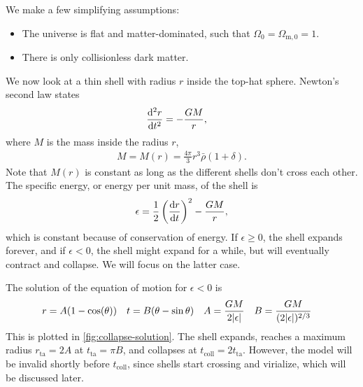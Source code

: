 We make a few simplifying assumptions:
\begin{itemize}
	\item The universe is flat and matter-dominated, such that $\Omega_0 = \Omega_{\text{m}, 0} = 1$.
	\item There is only collisionless dark matter.
\end{itemize}
We now look at a thin shell with radius $r$ inside the top-hat sphere. Newton's second law states
\begin{align*}
	\dv[2]{r}{t}
	&= - \frac{G M}{r},
\end{align*}
where $M$ is the mass inside the radius $r$,
\begin{align*}
	M = M(r) = \frac{4\pi}{3} r^3 \bar{\rho}(1+\delta).
\end{align*}
Note that $M(r)$ is constant as long as the different shells don't cross each other.
The specific energy, or energy per unit mass, of the shell is
\begin{align*}
	\epsilon = \frac{1}{2} \left( \dv{r}{t} \right)^2
	- \frac{G M}{r},
\end{align*}
which is constant because of conservation of energy.
If $\epsilon \geq 0$, the shell expands forever, and if $\epsilon < 0$, the shell might expand for a while, but will eventually contract and collapse. We will focus on the latter case.

The solution of the equation of motion for $\epsilon < 0$ is
\begin{align*}
	r &= A(1- \cos(\theta)) &
	t &= B(\theta - \sin\theta) &
	A &= \frac{GM}{2 \vert\epsilon\vert} &
	B &= \frac{GM}{(2 \vert\epsilon\vert)^{2/3}}
\end{align*}
This is plotted in \cref{fig:collapse-solution}.
The shell expands, reaches a maximum radius $r_\text{ta} = 2 A$ at $t_\text{ta} = \pi B$, and collapses at $t_\text{coll} = 2 t_\text{ta}$.
However, the model will be invalid shortly before $t_\text{coll}$, since shells start crossing and virialize, which will be discussed later.



